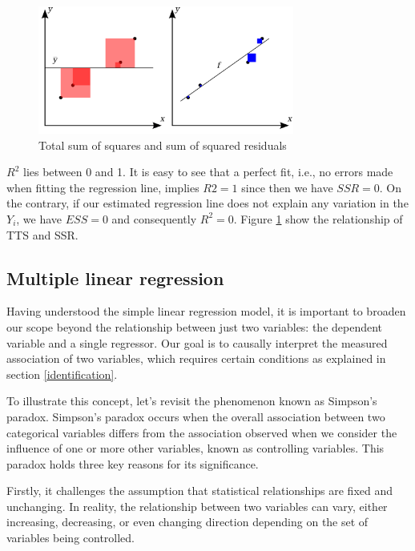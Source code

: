 \documentclass[
  12pt,
  oneside]{book}
\theoremstyle{definition}
\theoremstyle{definition}
\theoremstyle{definition}
\theoremstyle{definition}
\theoremstyle{remark}
\begin{document}
\begin{figure}
\centering
\includegraphics[width=0.75\textwidth,height=\textheight]{fig/fitR.png}
\caption{\label{fig:fitR} Total sum of squares and sum of squared residuals}
\end{figure}

\(R^2\) lies between 0 and 1. It is easy to see that a perfect fit, i.e., no errors made when fitting the regression line, implies \(R2=1\) since then we have \(SSR=0\). On the contrary, if our estimated regression line does not explain any variation in the \(Y_i\), we have \(ESS=0\) and consequently \(R^2=0\). Figure \ref{fig:fitR} show the relationship of TTS and SSR.

\hypertarget{multiple-linear-regression}{%
\subsection{Multiple linear regression}\label{multiple-linear-regression}}

Having understood the simple linear regression model, it is important to broaden our scope beyond the relationship between just two variables: the dependent variable and a single regressor. Our goal is to causally interpret the measured association of two variables, which requires certain conditions as explained in section \ref{identification}.

To illustrate this concept, let's revisit the phenomenon known as Simpson's paradox. Simpson's paradox occurs when the overall association between two categorical variables differs from the association observed when we consider the influence of one or more other variables, known as controlling variables. This paradox holds three key reasons for its significance.

Firstly, it challenges the assumption that statistical relationships are fixed and unchanging. In reality, the relationship between two variables can vary, either increasing, decreasing, or even changing direction depending on the set of variables being controlled.
\end{document}
